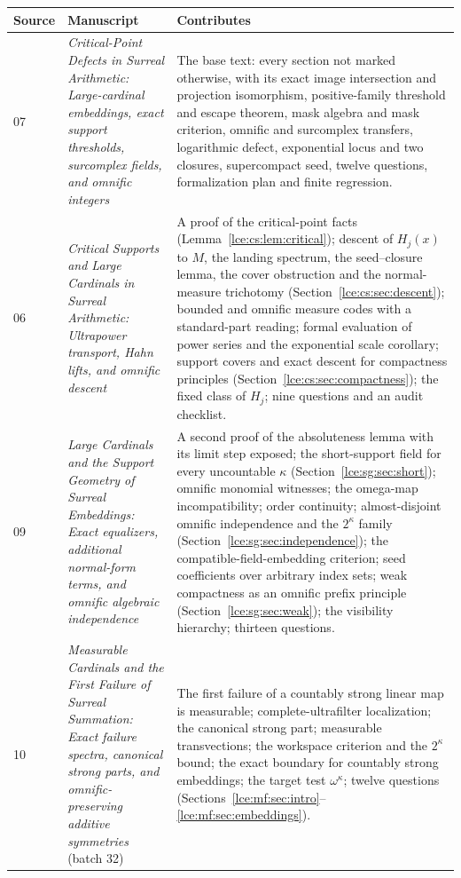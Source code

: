 \documentclass[11pt,letterpaper]{article}
\numberwithin{equation}{section}
\theoremstyle{definition}
\theoremstyle{remark}
\newcommand{\leref}[1]{Lemma~\ref{#1}}
\begin{document}
\begin{center}\small
\begin{longtable}{@{}P{0.07\textwidth}P{0.33\textwidth}P{0.53\textwidth}@{}}
\toprule
\textbf{Source} & \textbf{Manuscript} & \textbf{Contributes}\\
\midrule{} & \emph{Critical-Point Defects in Surreal Arithmetic: Large-cardinal
embeddings, exact support thresholds, surcomplex fields, and omnific
integers} & The base text: every section not marked otherwise, with its
exact image intersection and projection isomorphism, positive-family
threshold and escape theorem, mask algebra and mask criterion, omnific and
surcomplex transfers, logarithmic defect, exponential locus and two
closures, supercompact seed, twelve questions, formalization plan and
finite regression.\\[3pt]
06 & \emph{Critical Supports and Large Cardinals in Surreal Arithmetic:
Ultrapower transport, Hahn lifts, and omnific descent} & A proof of the
critical-point facts (\leref{lce:cs:lem:critical}); descent of $H_j(x)$ to
$M$, the landing spectrum, the seed--closure lemma, the cover obstruction and
the normal-measure trichotomy (Section~\ref{lce:cs:sec:descent}); bounded
and omnific measure codes with a standard-part reading; formal evaluation
of power series and the exponential scale corollary; support covers and
exact descent for compactness principles
(Section~\ref{lce:cs:sec:compactness}); the fixed class of $H_j$; nine
questions and an audit checklist.\\[3pt]
09 & \emph{Large Cardinals and the Support Geometry of Surreal Embeddings:
Exact equalizers, additional normal-form terms, and omnific algebraic
independence} & A second proof of the absoluteness lemma with its limit step
exposed; the short-support field for every uncountable $\kappa$
(Section~\ref{lce:sg:sec:short}); omnific monomial witnesses; the
omega-map incompatibility; order continuity; almost-disjoint omnific
independence and the $2^\kappa$ family (Section~\ref{lce:sg:sec:independence});
the compatible-field-embedding criterion; seed coefficients over arbitrary
index sets; weak compactness as an omnific prefix principle
(Section~\ref{lce:sg:sec:weak}); the visibility hierarchy; thirteen
questions.\\[3pt]
10 & \emph{Measurable Cardinals and the First Failure of Surreal Summation:
Exact failure spectra, canonical strong parts, and omnific-preserving
additive symmetries} (batch 32) & The first failure of a countably strong
linear map is measurable; complete-ultrafilter localization; the canonical
strong part; measurable transvections; the workspace criterion and the
$2^\kappa$ bound; the exact boundary for countably strong embeddings; the
target test $\omega^\kappa$; twelve questions
(Sections~\ref{lce:mf:sec:intro}--\ref{lce:mf:sec:embeddings}).\\
\bottomrule
\end{longtable}
\end{center}
\end{document}
